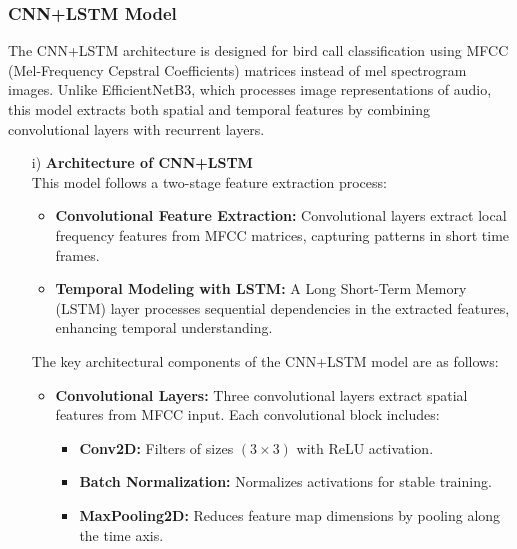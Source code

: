       \subsubsection{CNN+LSTM Model}
      The CNN+LSTM architecture is designed for bird call classification using MFCC (Mel-Frequency Cepstral Coefficients) matrices instead of mel spectrogram images. Unlike EfficientNetB3, which processes image representations of audio, this model extracts both spatial and temporal features by combining convolutional layers with recurrent layers.
      \begin{itemize}
     
            \item[i)] \textbf{Architecture of CNN+LSTM} \\
            This model follows a two-stage feature extraction process:

            \begin{itemize}
            \item \textbf{Convolutional Feature Extraction:} Convolutional layers extract local frequency features from MFCC matrices, capturing patterns in short time frames.
            \item \textbf{Temporal Modeling with LSTM:} A Long Short-Term Memory (LSTM) layer processes sequential dependencies in the extracted features, enhancing temporal understanding.
            \end{itemize}

            The key architectural components of the CNN+LSTM model are as follows:

            \begin{itemize}
            \item \textbf{Convolutional Layers:} Three convolutional layers extract spatial features from MFCC input. Each convolutional block includes:
            \begin{itemize}
                  \item \textbf{Conv2D:} Filters of sizes $(3 \times 3)$ with ReLU activation.
                  \item \textbf{Batch Normalization:} Normalizes activations for stable training.
                  \item \textbf{MaxPooling2D:} Reduces feature map dimensions by pooling along the time axis.
            \end{itemize}
            

\end{itemize}
\end{itemize}
